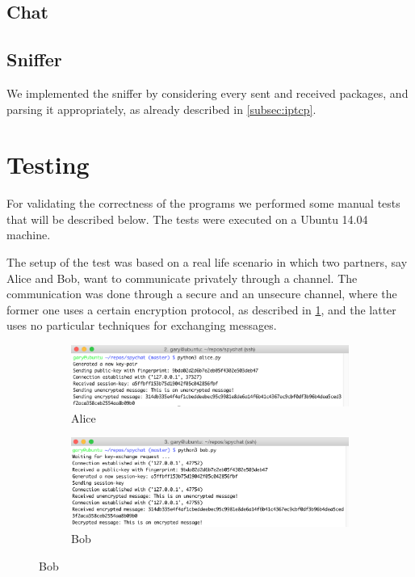 \documentclass[11pt, a4paper]{article}
\begin{document}
\subsection{Chat}

\subsection{Sniffer}

We implemented the sniffer by considering every sent and received
packages, and parsing it appropriately, as already described in
\ref{subsec:iptcp}. 

\section{Testing}

For validating the correctness of the programs we performed some
manual tests that will be described below. The tests were executed on
a Ubuntu 14.04 machine. 

The setup of the test was based on a real life scenario in which two
partners, say Alice and Bob, want to communicate privately through a
channel. The communication was done through a secure and an unsecure
channel, where the former one uses a certain encryption protocol, as
described in \ref{}, and the latter uses no particular techniques for
exchanging messages.

\begin{figure}[H]
  \centering
  \begin{subfigure}[b]{0.49\textwidth}
    \includegraphics[width=\linewidth]{img/test_alice}
    \caption{Alice}
    \label{fig:test_alice}
  \end{subfigure}
  \begin{subfigure}[b]{0.49\textwidth}
    \includegraphics[width=\textwidth]{img/test_bob}
    \caption{Bob}
    \label{fig:test_bob}
  \end{subfigure}
\end{figure}
\end{document}
